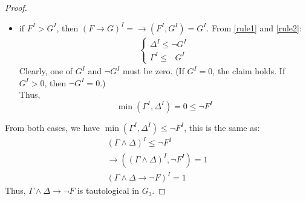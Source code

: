 \documentclass[12pt]{article}
\begin{document}
\begin{proof}
\begin{itemize}
\item if $F^I > G^I$, then $(F \rightarrow G)^I = \rightarrow (F^I, G^I) = G^I$. From \eqref{rule1} and  \eqref{rule2}:
\begin{gather*}
 \left\{
        \begin{array}{c}      
        \Delta^I \leq \neg G^I \\
        \Gamma^I \leq \:\:\:G^I
        \end{array}\right.
\end{gather*}
Clearly, one of $G^I$ and $\neg G^I$ must be zero. (If $G^I = 0$, the claim holds. If $G^I > 0$, then $\neg G^I = 0$.) \\
Thus, 
\begin{equation*}
\min(\Gamma^I, \Delta^I) = 0 \leq \neg F^I 
\end{equation*}
\end{itemize}
From both cases, we have $\min(\Gamma^I, \Delta^I) \leq \neg F^I$, this is the same as:
\begin{eqnarray*}
(\Gamma \wedge \Delta)^I \leq \neg F^I \\
\rightarrow ((\Gamma \wedge \Delta)^I, \neg F^I) = 1\\
(\Gamma \wedge \Delta \rightarrow \neg F)^I = 1
\end{eqnarray*}
Thus, $\Gamma \wedge \Delta \rightarrow \neg F$ is tautological in $G_3$. 
\end{proof}
\end{document}

